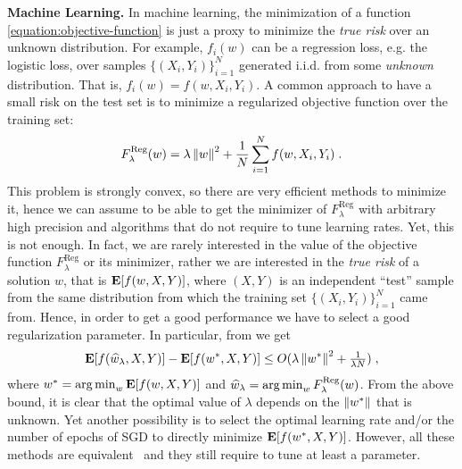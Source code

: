 \textbf{Machine Learning.} In machine learning, the minimization of a function
\eqref{equation:objective-function} is just a proxy to minimize the \emph{true
risk} over an unknown distribution. For example, $f_i(w)$ can be a
regression loss, e.g. the logistic loss, over samples $\{(X_i,
Y_i)\}_{i=1}^N$ generated i.i.d. from some \emph{unknown} distribution.
That is, $f_i(w)=f(w,X_i,Y_i)$. A common approach to
have a small risk on the test set is to minimize a regularized objective
function over the training set:
%
\begin{equation}
\label{equation:reg_logloss}
F_\lambda^{\text{Reg}}(w) = \lambda \left\|{w}\right\|^2 + \frac{1}{N} \sum_{i=1}^N f(w, X_i, Y_i) \; .
\end{equation}
%
This problem is strongly convex, so there are very efficient methods to
minimize it, hence we can assume to be able to get the minimizer of
$F_\lambda^{\text{Reg}}$ with arbitrary high precision and algorithms that do not require to tune learning rates. Yet, this is not
enough. In fact, we are rarely interested in the value of the objective
function $F_\lambda^{\text{Reg}}$ or its minimizer, rather we are interested in
the \emph{true risk} of a solution $w$, that is $\operatorname*{\mathbf{E}}[f(w,X,Y)]$, where $(X,Y)$
is an independent ``test'' sample from the same distribution from which the
training set $\{(X_i,Y_i)\}_{i=1}^N$ came from. Hence, in order to get a good
performance we have to select a good regularization parameter. In particular,
from \cite{Sridharan-Shalev-Shwartz-Srebro-2009} we get
\[
\operatorname*{\mathbf{E}}[f(\widehat{w}_\lambda,X,Y)] - \operatorname*{\mathbf{E}}[f(w^*,X,Y)] \le O(\lambda \left\|{w^*}\right\|^2 + \tfrac{1}{\lambda N}) \; ,
\]
where $w^*=\operatorname*{arg\,min}_w \operatorname*{\mathbf{E}}[f(w,X,Y)]$ and $\widehat{w}_\lambda = \operatorname*{arg\,min}_w
F_\lambda^{\text{Reg}}(w)$.  From the above bound, it is clear that the optimal value
of $\lambda$ depends on the $\left\|{w^*}\right\|$ that is unknown.
Yet another possibility is to select the optimal learning rate and/or the number of epochs of \ac{SGD} to directly minimize $\operatorname*{\mathbf{E}}[f(w^*,X,Y)]$. However, all these methods are equivalent~\citep{Lin-Camoriano-Rosasco-2016} and they still require to tune at least a parameter.

